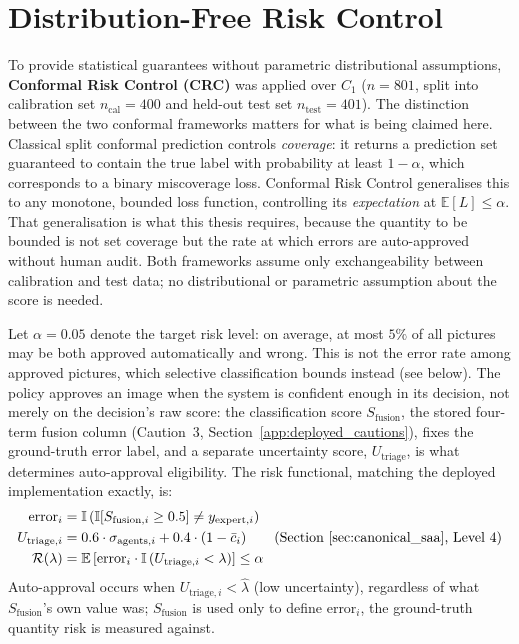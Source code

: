 \documentclass[12pt,a4paper]{report}
\begin{document}
\section{Distribution-Free Risk Control}
\label{sec:crc_distribution_free}
To provide statistical guarantees without parametric distributional assumptions, \textbf{Conformal Risk Control (CRC)} was applied \cite{crc2024} over $C_1$ ($n=801$, split into calibration set $n_{\text{cal}}=400$ and held-out test set $n_{\text{test}}=401$). The distinction between the two conformal frameworks matters for what is being claimed here. Classical split conformal prediction \cite{vovk2005algorithmic,angelopoulos2024conformal} controls \emph{coverage}: it returns a prediction set guaranteed to contain the true label with probability at least $1-\alpha$, which corresponds to a binary miscoverage loss. Conformal Risk Control \cite{crc2024} generalises this to any monotone, bounded loss function, controlling its \emph{expectation} at $\mathbb{E}[L] \le \alpha$. That generalisation is what this thesis requires, because the quantity to be bounded is not set coverage but the rate at which errors are auto-approved without human audit. Both frameworks assume only exchangeability between calibration and test data; no distributional or parametric assumption about the score is needed.

Let $\alpha = 0.05$ denote the target risk level: on average, at most $5\%$ of all pictures may be both approved automatically and wrong. This is not the error rate among approved pictures, which selective classification bounds instead (see below). The policy approves an image when the system is confident enough in its decision, not merely on the decision's raw score: the classification score $S_{\text{fusion}}$, the stored four-term fusion column (Caution~3, Section~\ref{app:deployed_cautions}), fixes the ground-truth error label, and a separate uncertainty score, $U_{\text{triage}}$, is what determines auto-approval eligibility. The risk functional, matching the deployed implementation exactly, is:
\begin{align}
    \text{error}_i &= \mathbb{I}\left(\mathbb{I}[S_{\text{fusion}, i} \ge 0.5] \neq y_{\text{expert}, i}\right) \\
    U_{\text{triage}, i} &= 0.6 \cdot \sigma_{\text{agents}, i} + 0.4 \cdot (1 - \bar{c}_i) \qquad \text{(Section~\ref{sec:canonical_saa}, Level 4)} \\
    \mathcal{R}(\lambda) &= \mathbb{E}\left[ \text{error}_i \cdot \mathbb{I}\left(U_{\text{triage}, i} < \lambda\right) \right] \le \alpha
\end{align}
Auto-approval occurs when $U_{\text{triage}, i} < \hat\lambda$ (low uncertainty), regardless of what $S_{\text{fusion}}$'s own value was; $S_{\text{fusion}}$ is used only to define $\text{error}_i$, the ground-truth quantity risk is measured against.
\end{document}
